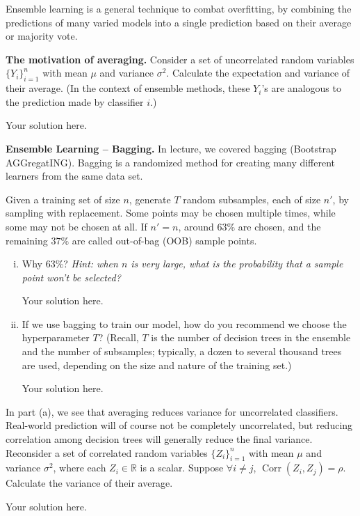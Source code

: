 Ensemble learning is a general technique to combat overfitting, by combining the predictions of many varied models into a single prediction based on their average or majority vote.
\begin{Parts} 
\Part
\textbf{The motivation of averaging.} Consider a set of uncorrelated random variables $\{Y_i\}_{i=1}^n$ with mean $\mu$ and variance $\sigma^2$. Calculate the expectation and variance of their average. (In the context of ensemble methods, these $Y_i$'s are analogous to the prediction made by classifier $i$.)

\begin{solution}
Your solution here.
\end{solution}

\Part
\textbf{Ensemble Learning – Bagging.} In lecture, we covered bagging (Bootstrap AGGregatING). Bagging is a randomized method for creating many different learners from the same data set.

Given a training set of size $n$, generate $T$ random subsamples, each of size $n'$, by sampling with replacement. Some points may be chosen multiple times, while some may not be chosen at all. If $n' = n$, around $63\%$ are chosen, and the remaining $37\%$ are called out-of-bag (OOB) sample points.
\begin{enumerate}[(i)]
	\item Why $63\%$? 
	\textit{Hint: when $n$ is very large, what is the probability that a sample point won't be selected?}
        
        \begin{solution}
            Your solution here.
        \end{solution}
	
	\item If we use bagging to train our model, how do you recommend we choose the hyperparameter $T$? (Recall, $T$ is the number of decision trees in the ensemble and the number of subsamples; typically, a dozen to several thousand trees are used, depending on the size and nature of the training set.)             
        \begin{solution}
            Your solution here.
        \end{solution}
\end{enumerate}

\Part
In part (a), we see that averaging reduces variance for uncorrelated classifiers. Real-world prediction will of course not be completely uncorrelated, but reducing correlation among decision trees will generally reduce the final variance. Reconsider a set of correlated random variables $\{Z_i\}_{i=1}^n$ with mean $\mu$ and variance $\sigma^2$, where each $Z_i \in \mathbb{R}$ is a scalar. Suppose $\forall i \neq j$, $\operatorname{Corr}(Z_i, Z_j) = \rho$. Calculate the variance of their average.

\begin{solution}
    Your solution here.
\end{solution}

\end{Parts}
